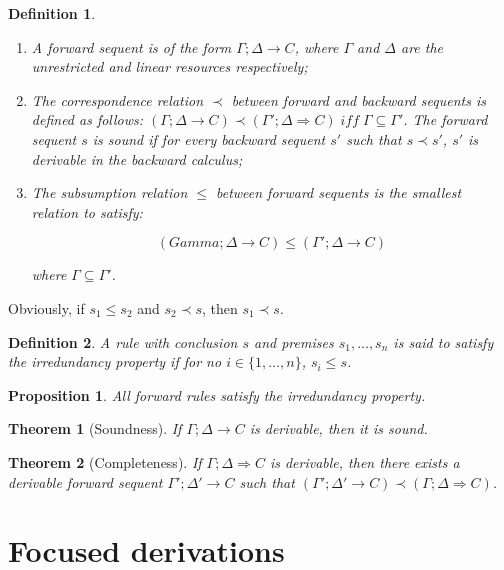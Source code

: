\documentclass{article}
\newtheorem{theorem}{Theorem}
\newtheorem{definition}{Definition}
\newtheorem{proposition}{Proposition}
\begin{document}
\begin{definition}
  \begin{enumerate}
  \item A forward sequent is of the form $\Gamma; \Delta
    \longrightarrow C$, where $\Gamma$ and $\Delta$ are the
    unrestricted and linear resources respectively;
  \item The correspondence relation $\prec$ between forward and
    backward sequents is defined as follows:
    $(\Gamma; \Delta \longrightarrow C) \prec
    (\Gamma';\Delta\Longrightarrow C) \; iff \; \Gamma \subseteq
    \Gamma'$. The forward sequent $s$ is sound if for every backward
    sequent $s'$ such that $s \prec s'$, $s'$ is derivable in the
    backward calculus;
  \item The subsumption relation $\leq$ between forward sequents is
    the smallest relation to satisfy:

    \[
      (Gamma; \Delta \longrightarrow C) \leq (\Gamma'; \Delta
      \longrightarrow C)
    \]

    where $\Gamma \subseteq \Gamma'$.
  \end{enumerate}
\end{definition}

Obviously, if $s_1 \leq s_2$ and $s_2 \prec s$, then $s_1 \prec s$.

\begin{definition}
  A rule with conclusion $s$ and premises $s_1, \dots, s_n$ is said to
  satisfy the irredundancy property if for no $i \in \{1, \dots, n\}$,
  $s_i \leq s$.
\end{definition}

\begin{proposition}
  All forward rules satisfy the irredundancy property.
\end{proposition}

\begin{theorem}[Soundness]
  If $\Gamma; \Delta \longrightarrow C$ is derivable, then it is
  sound.
\end{theorem}

\begin{theorem}[Completeness]
  If $\Gamma; \Delta \Longrightarrow C$ is derivable, then there
  exists a derivable forward sequent
  $\Gamma'; \Delta' \longrightarrow C$ such that
  $(\Gamma'; \Delta' \longrightarrow C) \prec (\Gamma; \Delta
  \Longrightarrow C)$.
\end{theorem}

\section{Focused derivations}
\end{document}
